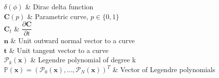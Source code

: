 \documentclass[12pt, oneside]{Thesis} %
\begin{document}
{$\delta(\phi)$ & Dirac delta function\\

$\textbf{C}(p)$ & Parametric curve, $p\in \{0,1 \}$ \\

$\textbf{C}_t$ & $\dfrac{\partial \textbf{C} }{\partial t}$ \\

$\textbf{n}$ & Unit outward normal vector to a curve \\

$\textbf{t}$ & Unit tangent vector to a curve \\

$\mathcal{P}_k(\textbf{x})$ & Legendre polynomial of degree k \\

$\mathbb{P}(\textbf{x})= \left(\mathcal{P}_0(\textbf{x}),\ldots, \mathcal{P}_{N}(\textbf{x})\right)^T $ & Vector of Legendre polynomials \\

}



\pagestyle{empty} %



\mainmatter %

\pagestyle{fancy} %
\setlength{\parindent}{2em}
%
%
% 
%
%
% 
% 
% 
% 



 


 
 
 
\end{document}
